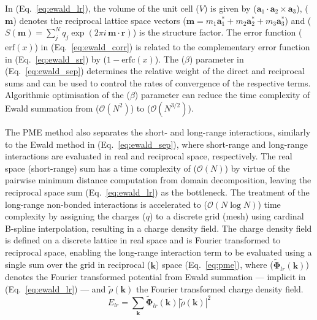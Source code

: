 In (Eq.~\ref{eq:ewald_lr}), the volume of the unit cell ($V$) is given by ($\mathbf{a}_1 \cdot \mathbf{a}_2 \times \mathbf{a}_3$), ($\mathbf{m}$) denotes the reciprocal lattice space vectors ($\mathbf{m}  =  m_1\mathbf{a}_1^{\ast} + m_2\mathbf{a}_2^{\ast} + m_3\mathbf{a}_3^{\ast}$) and ($S(\mathbf{m}) = \sum_{j}^{N} q_j \exp{(2 \pi i\, \mathbf{m\cdot r})}$) is the structure factor. The error function ($\mathrm{erf}(x)$) in (Eq.~\ref{eq:ewald_corr}) is related to the complementary error function in (Eq.~\ref{eq:ewald_sr}) by ($1 - \mathrm{erfc}(x)$). The ($\beta$) parameter in (Eq.~\ref{eq:ewald_sep}) determines the relative weight of the direct and reciprocal sums and can be used to control the rates of convergence of the respective terms. Algorithmic optimisation of the ($\beta$) parameter can reduce the time complexity of Ewald summation from ($\mathcal{O}(N^2)$) to ($\mathcal{O}(N^{3/2})$).\cite{karasawa1989acceleration,Darden1993} 

The PME method also separates the short- and long-range interactions, similarly to the Ewald method in (Eq.~\ref{eq:ewald_sep}), where short-range and long-range interactions are evaluated in real and reciprocal space, respectively. The real space (short-range) sum has a time complexity of ($\mathcal{O}(N)$) by virtue of the pairwise minimum distance computation from domain decomposition, leaving the reciprocal space sum (Eq.~\ref{eq:ewald_lr}) as the bottleneck. The treatment of the long-range non-bonded interactions is accelerated to ($\mathcal{O}(N \log N)$) time complexity by assigning the charges ($q$) to a discrete grid (mesh) using cardinal B-spline interpolation, \cite{Essmann1995} resulting in a charge density field. The charge density field is defined on a discrete lattice in real space and is Fourier transformed to reciprocal space, enabling the long-range interaction term to be evaluated using a single sum over the grid in reciprocal ($\mathbf{k}$) space (Eq.~\ref{eq:pme}), where ($\bm{\tilde{\Phi}}_{lr}(\mathbf{k})$) denotes the Fourier transformed potential from Ewald summation --- implicit in (Eq.~\ref{eq:ewald_lr}) --- and $\tilde{\rho}(\mathbf{k})$ the Fourier transformed charge density field.
%
\begin{equation} \label{eq:pme}
    E_{lr} = \sum_{\mathbf{k}} \bm{\tilde{\Phi}}_{lr}(\mathbf{k}) \left| \tilde{\rho}(\mathbf{k})\right|^2  
\end{equation}
%


